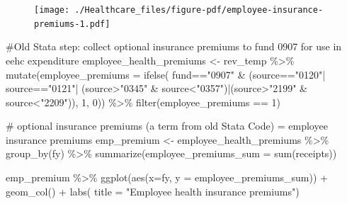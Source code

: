 \documentclass[
  letterpaper,
  DIV=11,
  numbers=noendperiod]{scrreport}
\newenvironment{Shaded}{\begin{snugshade}}{\end{snugshade}}
\newcommand{\AttributeTok}[1]{\textcolor[rgb]{0.40,0.45,0.13}{#1}}
\newcommand{\CommentTok}[1]{\textcolor[rgb]{0.37,0.37,0.37}{#1}}
\newcommand{\DecValTok}[1]{\textcolor[rgb]{0.68,0.00,0.00}{#1}}
\newcommand{\FunctionTok}[1]{\textcolor[rgb]{0.28,0.35,0.67}{#1}}
\newcommand{\NormalTok}[1]{\textcolor[rgb]{0.00,0.23,0.31}{#1}}
\newcommand{\OtherTok}[1]{\textcolor[rgb]{0.00,0.23,0.31}{#1}}
\newcommand{\SpecialCharTok}[1]{\textcolor[rgb]{0.37,0.37,0.37}{#1}}
\newcommand{\StringTok}[1]{\textcolor[rgb]{0.13,0.47,0.30}{#1}}
\begin{document}
\begin{figure}[H]

{\centering \texttt{[image: ./Healthcare\_files/figure-pdf/employee-insurance-premiums-1.pdf]}

}

\end{figure}

\begin{Shaded}
\begin{Highlighting}[]
\CommentTok{\#Old Stata step: collect optional insurance premiums to fund 0907 for use in eehc expenditure  }
\NormalTok{employee\_health\_premiums }\OtherTok{\textless{}{-}}\NormalTok{ rev\_temp }\SpecialCharTok{\%\textgreater{}\%} 
  \FunctionTok{mutate}\NormalTok{(}\AttributeTok{employee\_premiums =} \FunctionTok{ifelse}\NormalTok{(}
\NormalTok{    fund}\SpecialCharTok{==}\StringTok{"0907"} \SpecialCharTok{\&}\NormalTok{ (source}\SpecialCharTok{==}\StringTok{"0120"}\SpecialCharTok{|}\NormalTok{ source}\SpecialCharTok{==}\StringTok{"0121"}\SpecialCharTok{|}\NormalTok{ (source}\SpecialCharTok{\textgreater{}}\StringTok{"0345"} \SpecialCharTok{\&}\NormalTok{ source}\SpecialCharTok{\textless{}}\StringTok{"0357"}\NormalTok{)}\SpecialCharTok{|}\NormalTok{(source}\SpecialCharTok{\textgreater{}}\StringTok{"2199"} \SpecialCharTok{\&}\NormalTok{ source}\SpecialCharTok{\textless{}}\StringTok{"2209"}\NormalTok{)), }\DecValTok{1}\NormalTok{, }\DecValTok{0}\NormalTok{)) }\SpecialCharTok{\%\textgreater{}\%}
  \FunctionTok{filter}\NormalTok{(employee\_premiums }\SpecialCharTok{==} \DecValTok{1}\NormalTok{)}

\CommentTok{\# optional insurance premiums (a term from old Stata Code) = employee insurance premiums}
\NormalTok{emp\_premium }\OtherTok{\textless{}{-}}\NormalTok{ employee\_health\_premiums }\SpecialCharTok{\%\textgreater{}\%}
  \FunctionTok{group\_by}\NormalTok{(fy) }\SpecialCharTok{\%\textgreater{}\%}
  \FunctionTok{summarize}\NormalTok{(}\AttributeTok{employee\_premiums\_sum =} \FunctionTok{sum}\NormalTok{(receipts))}

  

\NormalTok{emp\_premium }\SpecialCharTok{\%\textgreater{}\%} 
  \FunctionTok{ggplot}\NormalTok{(}\FunctionTok{aes}\NormalTok{(}\AttributeTok{x=}\NormalTok{fy, }\AttributeTok{y =}\NormalTok{ employee\_premiums\_sum)) }\SpecialCharTok{+} 
  \FunctionTok{geom\_col}\NormalTok{() }\SpecialCharTok{+} 
  \FunctionTok{labs}\NormalTok{( }\AttributeTok{title =} \StringTok{"Employee health insurance premiums"}\NormalTok{)}
\end{Highlighting}
\end{Shaded}
\end{document}
